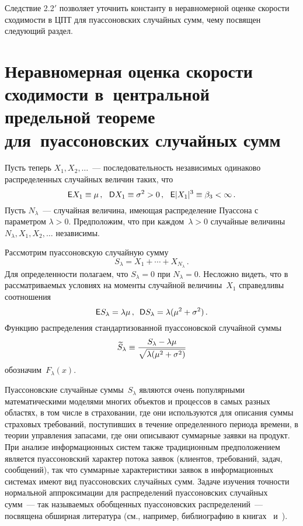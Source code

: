 \begin{multicols}{2}
\smallskip

Следствие 2.2$'$ позволяет уточнить константу в неравномерной
оценке скорости сходимости в ЦПТ для пуассоновских случайных сумм,
чему посвящен следующий раздел.

\vspace*{-3pt}

\section{Неравномерная оценка скорости сходимости в~центральной предельной
теореме для~пуассоновских случайных сумм}

Пусть теперь $X_1, X_2, \ldots$~--- последовательность независимых
одинаково распределенных случайных величин таких, что
\begin{equation}
{\sf E}X_1\equiv\mu\,, \ \ {\sf D}X_1 \equiv \sigma^2>0\,,\ \ {\sf
E}|X_1|^{\dd} \equiv \betr<\infty\,. \label{e27gv}
\end{equation}
Пусть $N_\lambda$~--- случайная величина, имеющая распределение
Пуассона с параметром $\lambda>0.$ Предположим, что при каждом~$\lambda>0$ 
случайные величины $N_\lambda, X_1, X_2,\ldots$
независимы.

Рассмотрим пуассоновскую случайную сумму
$$
S_{\lambda} = X_1+\cdots+ X_{N_\lambda}\,.
$$
Для определенности полагаем, что  $S_\lambda = 0$ при $N_\lambda =
0.$ Несложно видеть, что в рас\-смат\-ри\-ва\-емых условиях на моменты
случайной величины~$X_1$ справедливы соотношения
$$
{\sf E}S_\lambda=\lambda\mu\,, \enskip {\sf
D}S_\lambda=\lambda(\mu^2+\sigma^2)\,.
$$
Функцию распределения стандартизованной пуассоновской случайной
суммы
$$
\widetilde{S}_\lambda
\equiv\displaystyle\frac{\displaystyle S_\lambda-\lambda\mu\mathstrut}{\displaystyle \sqrt{\lambda(\mu^2+\sigma^2)}\mathstrut}
$$
обозначим~$F_\lambda(x)$.

\columnbreak

Пуассоновские случайные суммы~$S_{\lambda}$ являются очень
популярными математическими моделями многих объектов и процессов в
самых разных областях, в том числе в страховании, где они
используются для описания суммы страховых требований, поступивших
в течение определенного периода времени, в теории управления
запасами, где они описывают суммарные заявки на продукт. При
анализе информационных систем также традиционным предположением
является пуассоновский характер потока заявок (клиентов,
требований, задач, сообщений), так что суммарные характеристики
заявок в информационных системах имеют вид пуассоновских случайных
сумм. Задаче изуче\-ния точ\-ности нормальной аппроксимации для
распределений пуассоновских случайных сумм~--- так называемых
обобщенных пуассоновских распределений~--- посвящена обширная
литература (см., например, библиографию в книгах~\cite{KorBenShorg} и~\cite{BenKor2002}).


\end{multicols}
